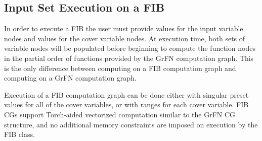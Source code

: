 \subsection{Input Set Execution on a FIB\label{sec:fib_exec}}
In order to execute a FIB the user must provide values for the input variable nodes and values for the cover variable nodes. At execution time, both sets of variable nodes will be populated before beginning to compute the function nodes in the partial order of functions provided by the GrFN computation graph. This is the only difference between computing on a FIB computation graph and computing on a GrFN computation graph.

Execution of a FIB computation graph can be done either with singular preset values for all of the cover variables, or with ranges for each cover variable.
FIB CGs support Torch-aided vectorized computation similar to the GrFN CG structure, and no additional memory constraints are imposed on execution by the FIB class.
